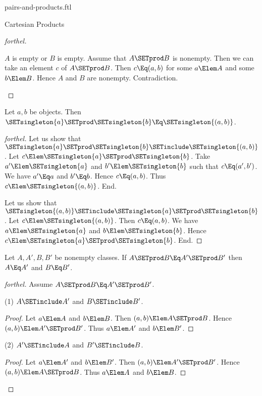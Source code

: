 \documentclass{stex}
\begin{document}
\begin{smodule}{pairs-and-products.ftl}
\begin{sfragment}{Cartesian Products}
\begin{proof}[forthel]
    \begin{case}{$A$ is empty or $B$ is empty.}
      Assume that $A \SETprod B$ is nonempty.
      Then we can take an element $c$ of $A \SETprod B$.
      Then $c \Eq (a, b)$ for some $a \Elem A$ and some $b \Elem B$.
      Hence $A$ and $B$ are nonempty.
      Contradiction.
    \end{case}
  \end{proof}

  \begin{proposition}[forthel]
    Let $a, b$ be objects.
    Then $\SETsingleton{a} \SETprod \SETsingleton{b} \Eq \SETsingleton{(a, b)}$.
  \end{proposition}
  \begin{proof}[forthel]
    Let us show that $\SETsingleton{a} \SETprod \SETsingleton{b} \SETinclude \SETsingleton{(a, b)}$.
      Let $c \Elem \SETsingleton{a} \SETprod \SETsingleton{b}$.
      Take $a' \Elem \SETsingleton{a}$ and $b' \Elem \SETsingleton{b}$ such that $c \Eq (a', b')$.
      We have $a' \Eq a$ and $b' \Eq b$.
      Hence $c \Eq (a, b)$.
      Thus $c \Elem \SETsingleton{(a, b)}$.
    End.

    Let us show that $\SETsingleton{(a, b)} \SETinclude \SETsingleton{a} \SETprod \SETsingleton{b}$.
      Let $c \Elem \SETsingleton{(a, b)}$.
      Then $c \Eq (a, b)$.
      We have $a \Elem \SETsingleton{a}$ and $b \Elem \SETsingleton{b}$.
      Hence $c \Elem \SETsingleton{a} \SETprod \SETsingleton{b}$.
    End.
  \end{proof}

  \begin{proposition}[forthel]
    Let $A, A', B, B'$ be nonempty classes.
    If $A \SETprod B \Eq A' \SETprod B'$ then $A \Eq A'$ and $B \Eq B'$.
  \end{proposition}
  \begin{proof}[forthel]
    Assume $A \SETprod B \Eq A' \SETprod B'$.

    (1) $A \SETinclude A'$ and $B \SETinclude B'$.
    \begin{proof}
      Let $a \Elem A$ and $b \Elem B$.
      Then $(a,b) \Elem A \SETprod B$.
      Hence $(a,b) \Elem A' \SETprod B'$.
      Thus $a \Elem A'$ and $b \Elem B'$.
    \end{proof}

    (2) $A' \SETinclude A$ and $B' \SETinclude B$.
    \begin{proof}
      Let $a \Elem A'$ and $b \Elem B'$.
      Then $(a,b) \Elem A' \SETprod B'$.
      Hence $(a,b) \Elem A \SETprod B$.
      Thus $a \Elem A$ and $b \Elem B$.
    \end{proof}
  \end{proof}
\end{sfragment}
\end{smodule}
\end{document}
